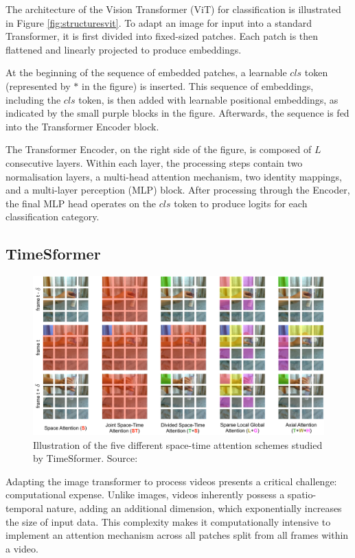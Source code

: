The architecture of the Vision Transformer (ViT) for classification is illustrated in Figure \ref{fig:structuresvit}. To adapt an image for input into a standard Transformer, it is first divided into fixed-sized patches. Each patch is then flattened and linearly projected to produce embeddings. 

At the beginning of the sequence of embedded patches, a learnable $cls$ token (represented by $*$ in the figure) is inserted. This sequence of embeddings, including the $cls$ token, is then added with learnable positional embeddings, as indicated by the small purple blocks in the figure. Afterwards, the sequence is fed into the Transformer Encoder block. 

The Transformer Encoder, on the right side of the figure, is composed of $L$ consecutive layers. Within each layer, the processing steps contain two normalisation layers, a multi-head attention mechanism, two identity mappings, and a multi-layer perception (MLP) block. After processing through the Encoder, the final MLP head operates on the $cls$ token to produce logits for each classification category.

\subsection{TimeSformer}
\begin{figure}[ht]
    \centering
    \includegraphics[width=1.0\textwidth]{assets/charts_rw/Timesformer}
    \caption[Five different space-time attention schemes studied by TimeSformer]{Illustration of the five different space-time attention schemes studied by TimeSformer. Source: \parencite{bertasius2021space}}
    \label{fig:structurestimesformer}
\end{figure}

Adapting the image transformer to process videos presents a critical challenge: computational expense. Unlike images, videos inherently possess a spatio-temporal nature, adding an additional dimension, which exponentially increases the size of input data. This complexity makes it computationally intensive to implement an attention mechanism across all patches split from all frames within a video.

